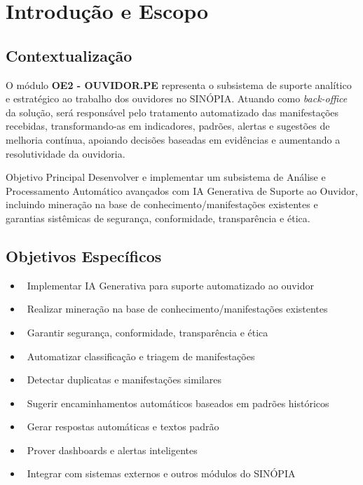 \documentclass[12pt,a4paper]{article}
\begin{document}
\tableofcontents
\newpage

\listoftables
\newpage

\section{Introdução e Escopo}

\subsection{Contextualização}

O módulo \textbf{OE2 - OUVIDOR.PE} representa o subsistema de suporte analítico e estratégico ao trabalho dos ouvidores no SINÓPIA. Atuando como \emph{back-office} da solução, será responsável pelo tratamento automatizado das manifestações recebidas, transformando-as em indicadores, padrões, alertas e sugestões de melhoria contínua, apoiando decisões baseadas em evidências e aumentando a resolutividade da ouvidoria.

\begin{highlightbox}{Objetivo Principal}
Desenvolver e implementar um subsistema de Análise e Processamento Automático avançados com IA Generativa de Suporte ao Ouvidor, incluindo mineração na base de conhecimento/manifestações existentes e garantias sistêmicas de segurança, conformidade, transparência e ética.
\end{highlightbox}

\subsection{Objetivos Específicos}

\begin{itemize}[leftmargin=*]
    \item \textbullet~Implementar IA Generativa para suporte automatizado ao ouvidor
    \item \textbullet~Realizar mineração na base de conhecimento/manifestações existentes
    \item \textbullet~Garantir segurança, conformidade, transparência e ética
    \item \textbullet~Automatizar classificação e triagem de manifestações
    \item \textbullet~Detectar duplicatas e manifestações similares
    \item \textbullet~Sugerir encaminhamentos automáticos baseados em padrões históricos
    \item \textbullet~Gerar respostas automáticas e textos padrão
    \item \textbullet~Prover dashboards e alertas inteligentes
    \item \textbullet~Integrar com sistemas externos e outros módulos do SINÓPIA
\end{itemize}
\end{document}
